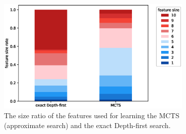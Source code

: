 \begin{figure}[htbp]
  \begin{center}
   \includegraphics[width=95mm]{img/feature_rate.eps}
  \end{center}
 \caption{The size ratio of the features used for learning the MCTS (approximate search) and the exact Depth-first search.}
  \label{fig:feature_rate}
\end{figure}

